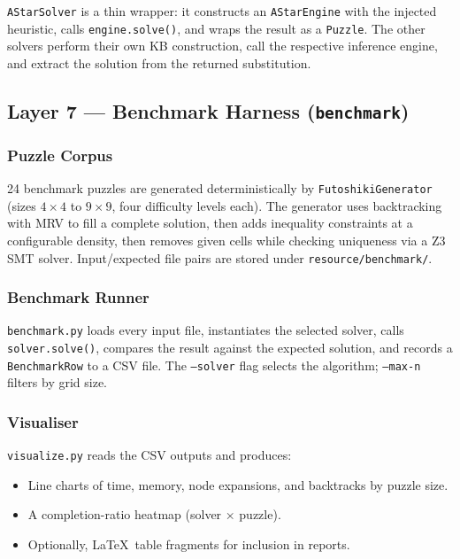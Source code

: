 \texttt{AStarSolver} is a thin wrapper: it constructs an \texttt{AStarEngine}
with the injected heuristic, calls \texttt{engine.solve()}, and wraps the
result as a \texttt{Puzzle}.
The other solvers perform their own KB construction, call the respective
inference engine, and extract the solution from the returned substitution.

\subsection{Layer 7 — Benchmark Harness (\texttt{benchmark})}
\label{sec:layer_benchmark}

\subsubsection{Puzzle Corpus}

24 benchmark puzzles are generated deterministically by \texttt{FutoshikiGenerator}
(sizes $4 \times 4$ to $9 \times 9$, four difficulty levels each).
The generator uses backtracking with MRV to fill a complete solution, then
adds inequality constraints at a configurable density, then removes given
cells while checking uniqueness via a Z3 SMT solver.
Input/expected file pairs are stored under \texttt{resource/benchmark/}.

\subsubsection{Benchmark Runner}

\texttt{benchmark.py} loads every input file, instantiates the selected solver,
calls \texttt{solver.solve()}, compares the result against the expected solution,
and records a \texttt{BenchmarkRow} to a CSV file.
The \texttt{--solver} flag selects the algorithm; \texttt{--max-n} filters by
grid size.

\subsubsection{Visualiser}

\texttt{visualize.py} reads the CSV outputs and produces:
\begin{itemize}
  \item Line charts of time, memory, node expansions, and backtracks by puzzle size.
  \item A completion-ratio heatmap (solver × puzzle).
  \item Optionally, \LaTeX\ table fragments for inclusion in reports.
\end{itemize}

